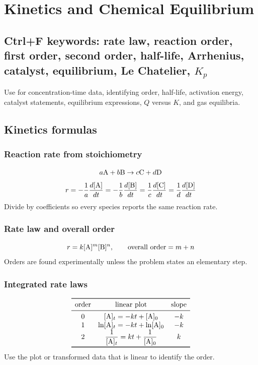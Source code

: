 \section{Kinetics and Chemical Equilibrium}

\subsection{Ctrl+F keywords: rate law, reaction order, first order, second order, half-life, Arrhenius, catalyst, equilibrium, Le Chatelier, \(K_p\)}
Use for concentration-time data, identifying order, half-life, activation energy, catalyst statements, equilibrium expressions, \(Q\) versus \(K\), and gas equilibria.

\subsection{Kinetics formulas}

\subsubsection{Reaction rate from stoichiometry}
\[
a\ce{A}+b\ce{B}\rightarrow c\ce{C}+d\ce{D}
\]
\[
r=-\frac{1}{a}\frac{d[\ce{A}]}{dt}
=-\frac{1}{b}\frac{d[\ce{B}]}{dt}
=\frac{1}{c}\frac{d[\ce{C}]}{dt}
=\frac{1}{d}\frac{d[\ce{D}]}{dt}
\]
Divide by coefficients so every species reports the same reaction rate.

\subsubsection{Rate law and overall order}
\[
r=k[\ce{A}]^m[\ce{B}]^n, \qquad \text{overall order}=m+n
\]
Orders are found experimentally unless the problem states an elementary step.

\subsubsection{Integrated rate laws}
\[
\begin{array}{c c c}
\toprule
\text{order} & \text{linear plot} & \text{slope}\\
\midrule
0 & [\ce{A}]_t=-kt+[\ce{A}]_0 & -k\\
1 & \ln[\ce{A}]_t=-kt+\ln[\ce{A}]_0 & -k\\
2 & \dfrac{1}{[\ce{A}]_t}=kt+\dfrac{1}{[\ce{A}]_0} & k\\
\bottomrule
\end{array}
\]
Use the plot or transformed data that is linear to identify the order.

